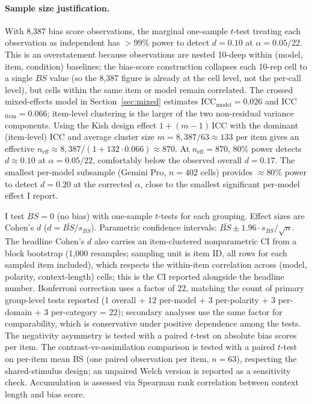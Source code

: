 \documentclass[10pt,twocolumn]{article}
\newcommand{\cohend}{Cohen's $d$}
\begin{document}
\paragraph{Sample size justification.}
With 8,387 bias score observations, the marginal one-sample $t$-test treating each observation as independent has $>$99\% power to detect $d = 0.10$ at $\alpha = 0.05/22$.
This is an overstatement because observations are nested 10-deep within (model, item, condition) baselines; the bias-score construction collapses each 10-rep cell to a single $BS$ value (so the 8,387 figure is already at the cell level, not the per-call level), but cells within the same item or model remain correlated.
The crossed mixed-effects model in Section~\ref{sec:mixed} estimates ICC$_\text{model} = 0.026$ and ICC$_\text{item} = 0.066$; item-level clustering is the larger of the two non-residual variance components. Using the Kish design effect $1 + (m-1)\,\text{ICC}$ with the dominant (item-level) ICC and average cluster size $m = 8{,}387 / 63 \approx 133$ per item gives an effective $n_\text{eff} \approx 8{,}387 / (1 + 132 \cdot 0.066) \approx 870$.
At $n_\text{eff} = 870$, 80\% power detects $d \approx 0.10$ at $\alpha = 0.05/22$, comfortably below the observed overall $d = 0.17$.
The smallest per-model subsample (Gemini Pro, $n = 402$ cells) provides $\approx 80\%$ power to detect $d = 0.20$ at the corrected $\alpha$, close to the smallest significant per-model effect I report.

I test $BS = 0$ (no bias) with one-sample $t$-tests for each grouping.
Effect sizes are \cohend{} ($d = \bar{BS} / s_{BS}$).
Parametric confidence intervals: $\bar{BS} \pm 1.96 \cdot s_{BS}/\sqrt{n}$.
The headline Cohen's $d$ also carries an item-clustered nonparametric CI from a block bootstrap (1,000 resamples; sampling unit is item ID, all rows for each sampled item included), which respects the within-item correlation across (model, polarity, context-length) cells; this is the CI reported alongside the headline number.
Bonferroni correction uses a factor of 22, matching the count of primary group-level tests reported (1 overall + 12 per-model + 3 per-polarity + 3 per-domain + 3 per-category = 22); secondary analyses use the same factor for comparability, which is conservative under positive dependence among the tests.
The negativity asymmetry is tested with a paired $t$-test on absolute bias scores per item.
The contrast-vs-assimilation comparison is tested with a paired $t$-test on per-item mean BS (one paired observation per item, $n = 63$), respecting the shared-stimulus design; an unpaired Welch version is reported as a sensitivity check.
Accumulation is assessed via Spearman rank correlation between context length and bias score.
\end{document}
